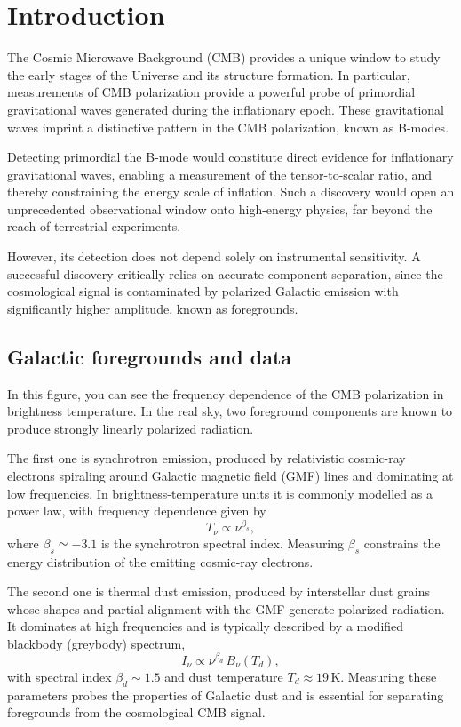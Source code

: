 \documentclass[12pt,a4paper]{article}
\begin{document}
\section{Introduction}


The Cosmic Microwave Background (CMB) provides a unique window to study the early stages of the Universe and its structure formation. In particular, measurements of CMB polarization provide a powerful probe of primordial gravitational waves generated during the inflationary epoch. These gravitational waves imprint a distinctive pattern in the CMB polarization, known as B-modes.

Detecting primordial the B-mode would constitute direct evidence for inflationary gravitational waves, enabling a measurement of the tensor-to-scalar ratio, and thereby constraining the energy scale of inflation. Such a discovery would open an unprecedented observational window onto high-energy physics, far beyond the reach of terrestrial experiments.

However, its detection does not depend solely on instrumental sensitivity. A successful discovery critically relies on accurate component separation, since the cosmological signal is contaminated by polarized Galactic emission with significantly higher amplitude, known as foregrounds.


\subsection{Galactic foregrounds and data}

In this figure, you can see the frequency dependence of the CMB polarization in brightness temperature. In the real sky, two foreground components are known to produce strongly linearly polarized radiation. 

The first one is synchrotron emission, produced by relativistic cosmic-ray electrons spiraling around Galactic magnetic field (GMF) lines and dominating at low frequencies. In brightness-temperature units it is commonly modelled as a power law, with frequency dependence given by
\begin{equation}
    T_{\nu} \propto \nu^{\beta_s},
\end{equation}
where $\beta_s \simeq -3.1$ is the synchrotron spectral index. Measuring $\beta_s$ constrains the energy distribution of the emitting cosmic-ray electrons.

The second one is thermal dust emission, produced by interstellar dust grains whose shapes and partial alignment with the GMF generate polarized radiation. It dominates at high frequencies and is typically described by a modified blackbody (greybody) spectrum,
\begin{equation}
    I_{\nu} \propto \nu^{\beta_d} \, B_{\nu}(T_d),
\end{equation}
with spectral index $\beta_d \sim 1.5$ and dust temperature $T_d \approx 19\,$K. Measuring these parameters probes the properties of Galactic dust and is essential for separating foregrounds from the cosmological CMB signal.
\end{document}
